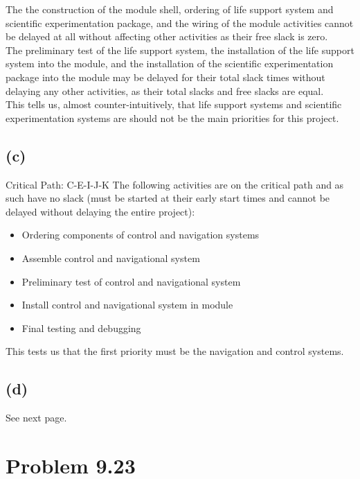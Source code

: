 \documentclass{article}
\begin{document}
	The the construction of the module shell, ordering of life support system and scientific experimentation package, and the wiring of the module activities cannot be delayed at all without affecting other activities as their free slack is zero.\\
	The preliminary test of the life support system, the installation of the life support system into the module, and the installation of the scientific experimentation package into the module may be delayed for their total slack times without delaying any other activities, as their total slacks and free slacks are equal.\\
	This tells us, almost counter-intuitively, that life support systems and scientific experimentation systems are should not be the main priorities for this project.
	
	\subsection*{(c)}
	\noindent Critical Path: C-E-I-J-K\newline
	The following activities are on the critical path and as such have no slack (must be started at their early start times and cannot be delayed without delaying the entire project):
	\begin{itemize}
		\item Ordering components of control and navigation systems\\
		\item Assemble control and navigational system\\
		\item Preliminary test of control and navigational system\\
		\item Install control and navigational system in module\\
		\item Final testing and debugging\\
	\end{itemize}
	\noindent This tests us that the first priority must be the navigation and control systems.
	
	\subsection*{(d)}
	\noindent See next page.

	\begin{sidewaystable}[!htbp]
		
	\end{sidewaystable}

	\pagebreak
	\section*{Problem 9.23}
\end{document}
